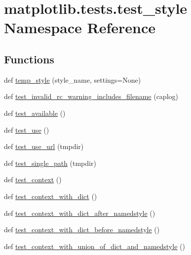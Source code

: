 \hypertarget{namespacematplotlib_1_1tests_1_1test__style}{}\section{matplotlib.\+tests.\+test\+\_\+style Namespace Reference}
\label{namespacematplotlib_1_1tests_1_1test__style}
\subsection*{Functions}
\begin{DoxyCompactItemize}
\item 
def \hyperlink{namespacematplotlib_1_1tests_1_1test__style_a3833b0d4e984c252d6b84e9cf672e961}{temp\+\_\+style} (style\+\_\+name, settings=None)
\item 
def \hyperlink{namespacematplotlib_1_1tests_1_1test__style_a36cdb88a0384bbbe52e51a3451a67e38}{test\+\_\+invalid\+\_\+rc\+\_\+warning\+\_\+includes\+\_\+filename} (caplog)
\item 
def \hyperlink{namespacematplotlib_1_1tests_1_1test__style_abb9df88ca4471b0559672667755fcb9b}{test\+\_\+available} ()
\item 
def \hyperlink{namespacematplotlib_1_1tests_1_1test__style_ae5fb482523486c5db1c904015a5bbf59}{test\+\_\+use} ()
\item 
def \hyperlink{namespacematplotlib_1_1tests_1_1test__style_af8eda19d4f1b5a4409ebb5a4ae6ead51}{test\+\_\+use\+\_\+url} (tmpdir)
\item 
def \hyperlink{namespacematplotlib_1_1tests_1_1test__style_a4e7be576fb0237d3342cb97da5b267d3}{test\+\_\+single\+\_\+path} (tmpdir)
\item 
def \hyperlink{namespacematplotlib_1_1tests_1_1test__style_abcbd81cdff8791fd3eb424427bf54ede}{test\+\_\+context} ()
\item 
def \hyperlink{namespacematplotlib_1_1tests_1_1test__style_a9308a8186e5e399edeecb912639b952e}{test\+\_\+context\+\_\+with\+\_\+dict} ()
\item 
def \hyperlink{namespacematplotlib_1_1tests_1_1test__style_a8ac522fd57ab8deb04498370834ff138}{test\+\_\+context\+\_\+with\+\_\+dict\+\_\+after\+\_\+namedstyle} ()
\item 
def \hyperlink{namespacematplotlib_1_1tests_1_1test__style_a4869ee653e85186b7054624ab04f49c9}{test\+\_\+context\+\_\+with\+\_\+dict\+\_\+before\+\_\+namedstyle} ()
\item 
def \hyperlink{namespacematplotlib_1_1tests_1_1test__style_a41d6fd3a454fc7c2d090f9d86c06e1f3}{test\+\_\+context\+\_\+with\+\_\+union\+\_\+of\+\_\+dict\+\_\+and\+\_\+namedstyle} ()

\end{DoxyCompactItemize}
